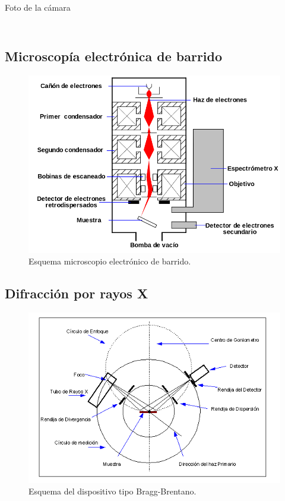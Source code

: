 \documentclass[11pt]{beamer}
\begin{document}
\begin{frame}{Foto de la cámara}
\begin{columns}[T]
\begin{column}{.49\textwidth}
\begin{figure}[H]
					\end{figure}
				\end{column}
			\end{columns}
		\end{frame}
	
	\subsection{Microscopía electrónica de barrido}
		\begin{frame}{}
			\begin{figure}[H]
				\centering
				\includegraphics[scale=0.3]{img/SEM.png}
				\caption{Esquema microscopio electrónico de barrido.}
			\end{figure}
		\end{frame}
	
	\subsection{Difracción por rayos X}
		\begin{frame}{}
			\begin{figure}[H]
				\centering
				\includegraphics[scale=0.6]{img/gonio.png}
				\caption{Esquema del dispositivo tipo Bragg-Brentano.}
			\end{figure}
		\end{frame}
	
\end{document}
